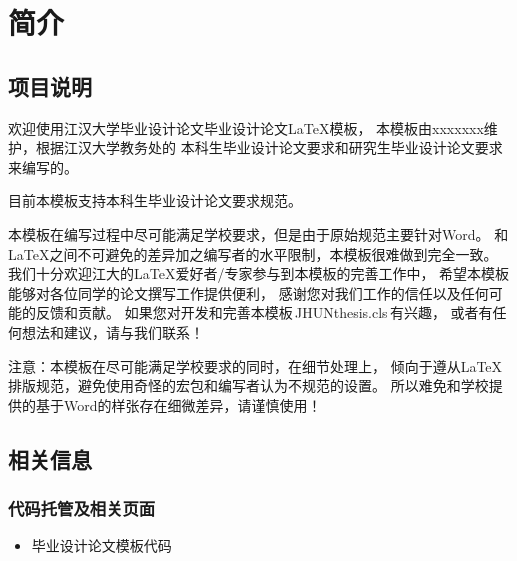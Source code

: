 \chapter{简介}

\section{项目说明}

欢迎使用江汉大学毕业设计论文毕业设计论文\LaTeX{}模板，
本模板由xxxxxxx维护，根据江汉大学教务处的
本科生毕业设计论文要求和研究生毕业设计论文要求来编写的。

目前本模板支持本科生毕业设计论文要求规范。

本模板在编写过程中尽可能满足学校要求，但是由于原始规范主要针对Word。
和\LaTeX{}之间不可避免的差异加之编写者的水平限制，本模板很难做到完全一致。
我们十分欢迎江大的\LaTeX{}爱好者/专家参与到本模板的完善工作中，
希望本模板能够对各位同学的论文撰写工作提供便利，
感谢您对我们工作的信任以及任何可能的反馈和贡献。
如果您对开发和完善本模板\,JHUNthesis.cls\,有兴趣，
或者有任何想法和建议，请与我们联系！

{\heiti 注意：}本模板在尽可能满足学校要求的同时，在细节处理上，
倾向于遵从\LaTeX{}排版规范，避免使用奇怪的宏包和编写者认为不规范的设置。
所以难免和学校提供的基于Word的样张存在细微差异，请谨慎使用！

\section{相关信息}


\subsection{代码托管及相关页面}
\begin{itemize}
    \item 毕业设计论文模板代码
\end{itemize}

